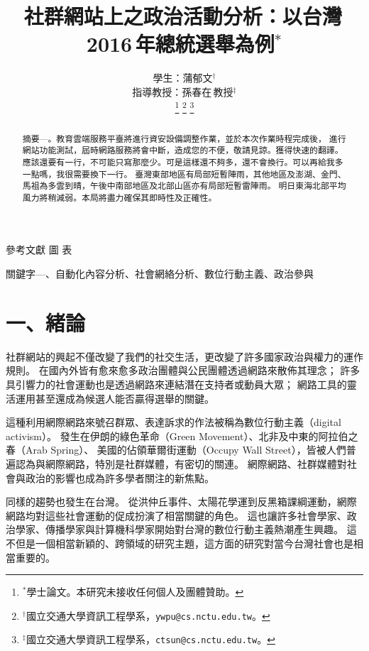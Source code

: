 \documentclass[letterpaper, 10pt, conference]{ieeeconf}   %
\title{\LARGE \bf
社群網站上之政治活動分析：以台灣\,2016\,年總統選舉為例$^{\ast}$
}
\author{\parbox{3 in}{\centering 學生：蒲郁文$^{\dagger}$}
        \hspace*{0.5 in}
        \parbox{3 in}{\centering 指導教授：孫春在\,教授$^{\ddagger}$}
        \thanks{$^{\ast}$學士論文。本研究未接收任何個人及團體贊助。}
        \thanks{$^{\dagger}$國立交通大學資訊工程學系，{\tt\small ywpu@cs.nctu.edu.tw}。}
        \thanks{$^{\ddagger}$國立交通大學資訊工程學系，{\tt\small ctsun@cs.nctu.edu.tw}。}
}
\begin{document}
\begin{CJK*}{UTF8}{bsmi}
\onehalfspacing
\refname{參考文獻}
\figurename{圖}
\tablename{表}

\maketitle
\thispagestyle{empty}
\pagestyle{empty}


\begin{abstract}
摘要\enskip---。教育雲端服務平臺將進行資安設備調整作業，並於本次作業時程完成後，
進行網站功能測試，屆時網路服務將會中斷，造成您的不便，敬請見諒。獲得快速的翻譯。
應該還要有一行，不可能只寫那麼少。可是這樣還不夠多，還不會換行。可以再給我多一點嗎，我很需要換下一行。
臺灣東部地區有局部短暫陣雨，其他地區及澎湖、金門、馬祖為多雲到晴，午後中南部地區及北部山區亦有局部短暫雷陣雨。
明日東海北部平均風力將稍減弱。本局將盡力確保其即時性及正確性。
\end{abstract}

\begin{keywords}
關鍵字\enskip---、自動化內容分析、社會網絡分析、數位行動主義、政治參與
\end{keywords}


\section*{一、緒論}

社群網站的興起不僅改變了我們的社交生活，更改變了許多國家政治與權力的運作規則。
在國內外皆有愈來愈多政治團體與公民團體透過網路來散佈其理念；
許多具引響力的社會運動也是透過網路來連結潛在支持者或動員大眾；
網路工具的靈活運用甚至還成為候選人能否贏得選舉的關鍵。

這種利用網際網路來號召群眾、表達訴求的作法被稱為數位行動主義（digital activism）。
發生在伊朗的綠色革命（Green Movement）、北非及中東的阿拉伯之春（Arab Spring）、
美國的佔領華爾街運動（Occupy Wall Street），皆被人們普遍認為與網際網路，特別是社群媒體，有密切的關連。
網際網路、社群媒體對社會與政治的影響也成為許多學者關注的新焦點。

同樣的趨勢也發生在台灣。
從洪仲丘事件、太陽花學運到反黑箱課綱運動，網際網路均對這些社會運動的促成扮演了相當關鍵的角色。
這也讓許多社會學家、政治學家、傳播學家與計算機科學家開始對台灣的數位行動主義熱潮產生興趣。
這不但是一個相當新穎的、跨領域的研究主題，這方面的研究對當今台灣社會也是相當重要的。


\end{CJK*}
\end{document}
